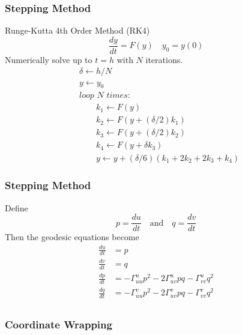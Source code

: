 \documentclass{beamer}
\begin{document}
\begin{frame}
	
	\frametitle{Stepping Method}
	
	Runge-Kutta 4th Order Method (RK4)
	\begin{equation*}
	\frac{dy}{dt} = F(y) \quad y_0 = y(0)
	\end{equation*}
	Numerically solve up to $t=h$ with $N$ iterations.
	\begin{align*}
	& \delta \gets h/N \\
	& y \gets y_0 \\
	& \textit{loop } N \textit{ times:} \\
	& \quad\quad k_1 \gets F(y) \\
	& \quad\quad k_2 \gets F\left(y+(\delta/2)k_1\right) \\
	& \quad\quad k_3 \gets F\left(y+(\delta/2)k_2\right) \\
	& \quad\quad k_4 \gets F\left(y + \delta k_3\right) \\
	& \quad\quad y \gets y+(\delta/6)(k_1+2k_2+2k_3+k_4)
	\end{align*}
	
\end{frame}


\begin{frame}
	
	\frametitle{Stepping Method}
	
	Define
	\begin{equation*}
	p = \frac{du}{dt} \quad\text{and}\quad q = \frac{dv}{dt}
	\end{equation*}
	Then the geodesic equations become
	\begin{align*}
	\frac{du}{dt} & = p \\
	\frac{dv}{dt} & = q \\
	\frac{dp}{dt} & = -\Gamma^u_{uu}p^2-2\Gamma^u_{uv}pq-\Gamma^u_{vv}q^2 \\
	\frac{dq}{dt} & = -\Gamma^v_{uu}p^2-2\Gamma^v_{uv}pq-\Gamma^v_{vv}q^2 \\
	\end{align*}
	
\end{frame}


\begin{frame}
	
	\frametitle{Coordinate Wrapping}
	
	\begin{figure}
		
	\end{figure}
	
\end{frame}
\end{document}
